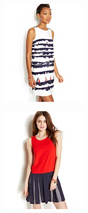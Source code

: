 \documentclass[11pt]{article}
\begin{document}
\begin{figure}
\begin{subfigure}{.18\textwidth}
\includegraphics[width=\linewidth]{concepts/concept2_pos2.jpg}
\label{fig:sub2}
\end{subfigure}
\begin{subfigure}{.18\textwidth}
\centering
\includegraphics[width=\linewidth]{concepts/concept2_pos3.jpg}

\end{subfigure}
\end{figure}
\end{document}
